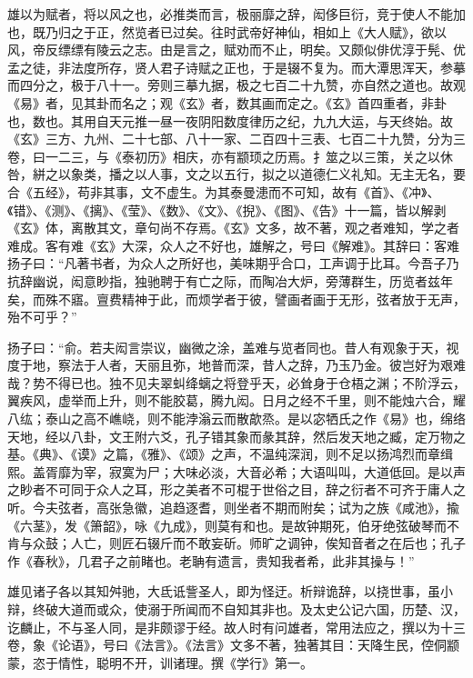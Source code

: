 \documentclass[12pt,UTF8]{ctexbook}
\begin{document}
雄以为赋者，将以风之也，必推类而言，极丽靡之辞，闳侈巨衍，竞于使人不能加也，既乃归之于正，然览者已过矣。往时武帝好神仙，相如上《大人赋》，欲以风，帝反缥缥有陵云之志。由是言之，赋劝而不止，明矣。又颇似俳优淳于髡、优孟之徒，非法度所存，贤人君子诗赋之正也，于是辍不复为。而大潭思浑天，参摹而四分之，极于八十一。旁则三摹九据，极之七百二十九赞，亦自然之道也。故观《易》者，见其卦而名之；观《玄》者，数其画而定之。《玄》首四重者，非卦也，数也。其用自天元推一昼一夜阴阳数度律历之纪，九九大运，与天终始。故《玄》三方、九州、二十七部、八十一家、二百四十三表、七百二十九赞，分为三卷，曰一二三，与《泰初历》相庆，亦有颛顼之历焉。扌筮之以三策，关之以休咎，絣之以象类，播之以人事，文之以五行，拟之以道德仁义礼知。无主无名，要合《五经》，苟非其事，文不虚生。为其泰曼漶而不可知，故有《首》、《冲》、《错》、《测》、《摛》、《莹》、《数》、《文》、《掜》、《图》、《告》十一篇，皆以解剥《玄》体，离散其文，章句尚不存焉。《玄》文多，故不著，观之者难知，学之者难成。客有难《玄》大深，众人之不好也，雄解之，号曰《解难》。其辞曰：客难扬子曰：“凡著书者，为众人之所好也，美味期乎合口，工声调于比耳。今吾子乃抗辞幽说，闳意眇指，独驰聘于有亡之际，而陶冶大炉，旁薄群生，历览者兹年矣，而殊不寤。亶费精神于此，而烦学者于彼，譬画者画于无形，弦者放于无声，殆不可乎？”



扬子曰：“俞。若夫闳言崇议，幽微之涂，盖难与览者同也。昔人有观象于天，视度于地，察法于人者，天丽且弥，地普而深，昔人之辞，乃玉乃金。彼岂好为艰难哉？势不得已也。独不见夫翠虯绛螭之将登乎天，必耸身于仓梧之渊；不阶浮云，翼疾风，虚举而上升，则不能胶葛，腾九闳。日月之经不千里，则不能烛六合，耀八纮；泰山之高不嶕峣，则不能浡滃云而散歊烝。是以宓牺氏之作《易》也，绵络天地，经以八卦，文王附六爻，孔子错其象而彖其辞，然后发天地之臧，定万物之基。《典》、《谟》之篇，《雅》、《颂》之声，不温纯深润，则不足以扬鸿烈而章缉熙。盖胥靡为宰，寂寞为尸；大味必淡，大音必希；大语叫叫，大道低回。是以声之眇者不可同于众人之耳，形之美者不可棍于世俗之目，辞之衍者不可齐于庸人之听。今夫弦者，高张急徽，追趋逐耆，则坐者不期而附矣；试为之族《咸池》，揄《六茎》，发《箫韶》，咏《九成》，则莫有和也。是故钟期死，伯牙绝弦破琴而不肯与众鼓；人亡，则匠石辍斤而不敢妄斫。师旷之调钟，俟知音者之在后也；孔子作《春秋》，几君子之前睹也。老聃有遗言，贵知我者希，此非其操与！”



雄见诸子各以其知舛驰，大氐诋訾圣人，即为怪迂。析辩诡辞，以挠世事，虽小辩，终破大道而或众，使溺于所闻而不自知其非也。及太史公记六国，历楚、汉，讫麟止，不与圣人同，是非颇谬于经。故人时有问雄者，常用法应之，撰以为十三卷，象《论语》，号曰《法言》。《法言》文多不著，独著其目：天降生民，倥侗颛蒙，恣于情性，聪明不开，训诸理。撰《学行》第一。
\end{document}
